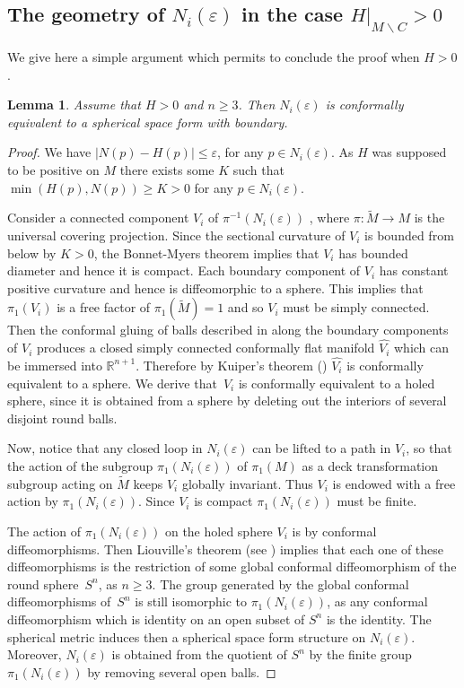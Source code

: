\documentclass[JEP,XML,SOM,Unicode]{cedram}
\let\moins\smallsetminus
\newtheorem{lemma}[theorem]{Lemma}
\theoremstyle{definition}
\theoremstyle{remark}
\numberwithin{equation}{section}
\begin{document}
\subsection{The geometry of $N_i(\varepsilon)$ in the case $H|_{M\moins C}>0$}
We give here a simple argument which permits to conclude the proof when $H>0$.
\begin{lemma}
Assume that $H >0$ and $n\geq3$. Then $N_i(\varepsilon)$ is conformally equivalent
to a spherical space form with boundary.
\end{lemma}
\begin{proof}
We have $|N(p)-H(p)| \leq \varepsilon$, for
any $p\in N_i(\varepsilon)$.
As $H$ was supposed to be positive on $M$ there exists some $K$
such that $\min(H(p), N(p)) \geq K > 0$ for any $p\in N_i(\varepsilon)$.

Consider a connected component $V_i$ of $\pi^{-1}(N_i(\varepsilon))$ ,
where $\pi:\widetilde{M}\to M$ is
the universal covering projection.
Since the sectional curvature of $V_i$ is bounded from
below by $K >0$, the Bonnet-Myers theorem implies that
$V_i$ has bounded diameter and hence it is
compact. Each boundary component of $V_i$ has constant positive curvature and hence
is diffeomorphic to a sphere.
This implies that $\pi_1(V_i)$ is a free factor of $\pi_1(\widetilde{M})=1$
and so $V_i$ must be simply connected.
Then the conformal gluing of balls
described in \cite[\S2]{Pi} along the boundary components
of $V_i$ produces a closed simply connected conformally flat manifold
$\widehat{V_i}$ which can be immersed into $\mathbb R^{n+1}$.
Therefore by Kuiper's theorem (\cite{Ku1}) $\widehat{V_i}$ is conformally equivalent to a sphere.
We derive that~$V_i$ is conformally equivalent to a holed sphere, since it is obtained from a sphere
by deleting out the interiors of several disjoint round balls.

Now, notice that any closed loop in $N_i(\varepsilon)$ can be lifted
to a path in $V_i$, so that the action of the subgroup
$\pi_1(N_i(\varepsilon))$ of $\pi_1(M)$ as a deck transformation subgroup
acting on $\widetilde{M}$ keeps $V_i$ globally invariant.
Thus $V_i$ is endowed with a free action by $\pi_1(N_i(\varepsilon))$.
Since $V_i$ is compact $\pi_1(N_i(\varepsilon))$ must be finite.

The action of $\pi_1(N_i(\varepsilon))$ on the holed sphere
$V_i$ is by conformal diffeomorphisms. Then Liouville's theorem (see \cite[Th.\,3.1]{Kul3}) implies
that each one of these diffeomorphisms is the restriction of some global conformal diffeomorphism
of the round sphere~$S^{n}$, as $n\geq3$. The group generated by the global conformal diffeomorphisms of~$S^n$ is still isomorphic to $\pi_1(N_i(\varepsilon))$, as any conformal diffeomorphism which is identity on an open subset of $S^n$
is the identity. The spherical metric induces then a spherical space form structure on $N_i(\varepsilon)$.
Moreover, $N_i(\varepsilon)$ is obtained from the quotient of $S^n$ by the finite group $\pi_1(N_i(\varepsilon))$
by removing several open balls.
\end{proof}
\end{document}
